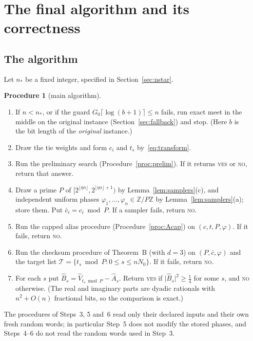 \documentclass[11pt]{article}
\theoremstyle{definition}
\newtheorem{procedure}[lemma]{Procedure}
\newcommand{\Z}{\mathbb Z}
\newcommand{\bc}{\bar c}
\newcommand{\abs}[1]{\lvert #1\rvert}
\newcommand{\floor}[1]{\lfloor #1\rfloor}
\newcommand{\ceil}[1]{\lceil #1\rceil}
\newcommand{\cT}{\mathcal T}
\begin{document}
\section{The final algorithm and its correctness}\label{sec:final}

\subsection{The algorithm}
Let $n_\ast$ be a fixed integer, specified in Section~\ref{sec:nstar}.
\begin{procedure}[main algorithm]\label{proc:main}
\begin{enumerate}[label=\arabic*.]
\item If $n<n_\ast$, or if the guard $G_0\ceil{\log(b+1)}\le n$ fails, run exact meet in the middle on the original
instance (Section~\ref{sec:fallback}) and stop. (Here $b$ is the bit length of the \emph{original} instance.)
\item Draw the tie weights and form $c_i$ and $t_s$ by~\eqref{eq:transform}.
\item Run the preliminary search (Procedure~\ref{proc:prelim}). If it returns \textsc{yes} or \textsc{no}, return
that answer.
\item Draw a prime $P$ of $[2^{\floor{\eta n}},2^{\floor{\eta n}+1})$ by Lemma~\ref{lem:samplers}(c), and independent
uniform phases $\varphi_1,\dots,\varphi_n\in\Z/P\Z$ by Lemma~\ref{lem:samplers}(a); store them. Put $\bc_i=c_i\bmod P$.
If a sampler fails, return \textsc{no}.
\item Run the capped alias procedure (Procedure~\ref{proc:Acap}) on $(c,t,P,\varphi)$. If it fails, return \textsc{no}.
\item Run the checksum procedure of Theorem~B (with $d=3$) on $(P,\bc,\varphi)$ and the target list
$\cT=\{t_s\bmod P:0\le s\le nN_0\}$. If it fails, return \textsc{no}.
\item For each $s$ put $\hat B_s=\hat V_{t_s\bmod P}-\hat A_s$. Return \textsc{yes} if $\abs{\hat B_s}^2\ge\tfrac14$ for
some $s$, and \textsc{no} otherwise. (The real and imaginary parts are dyadic rationals with $n^2+O(n)$ fractional
bits, so the comparison is exact.)
\end{enumerate}
\end{procedure}
The procedures of Steps~3, 5 and~6 read only their declared inputs and their own fresh random words; in
particular Step~5 does not modify the stored phases, and Steps~4--6 do not read the random words used in Step~3.
\end{document}

